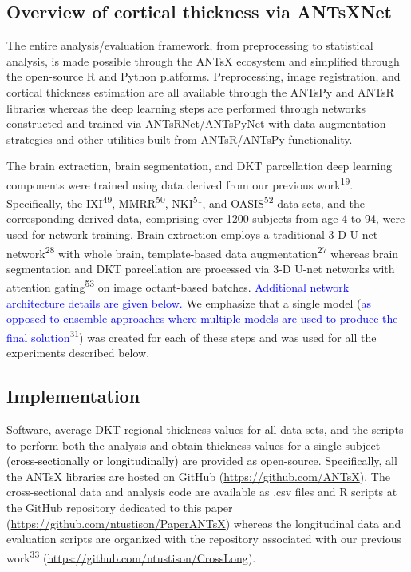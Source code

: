 \documentclass[12pt,]{article}
\begin{document}
\hypertarget{overview-of-cortical-thickness-via-antsxnet}{%
\subsection*{Overview of cortical thickness via
ANTsXNet}\label{overview-of-cortical-thickness-via-antsxnet}}

The entire analysis/evaluation framework, from preprocessing to
statistical analysis, is made possible through the ANTsX ecosystem and
simplified through the open-source R and Python platforms.
Preprocessing, image registration, and cortical thickness estimation are
all available through the ANTsPy and ANTsR libraries whereas the deep
learning steps are performed through networks constructed and trained
via ANTsRNet/ANTsPyNet with data augmentation strategies and other
utilities built from ANTsR/ANTsPy functionality.

The brain extraction, brain segmentation, and DKT parcellation deep
learning components were trained using data derived from our previous
work\textsuperscript{19}. Specifically, the IXI\textsuperscript{49},
MMRR\textsuperscript{50}, NKI\textsuperscript{51}, and
OASIS\textsuperscript{52} data sets, and the corresponding derived data,
comprising over 1200 subjects from age 4 to 94, were used for network
training. Brain extraction employs a traditional 3-D U-net
network\textsuperscript{28} with whole brain, template-based data
augmentation\textsuperscript{27} whereas brain segmentation and DKT
parcellation are processed via 3-D U-net networks with attention
gating\textsuperscript{53} on image octant-based batches.
\textcolor{blue}{Additional network architecture details are given below.}
We emphasize that a single model
(\textcolor{blue}{as opposed to ensemble
approaches where multiple models are used to produce the final solution}\textsuperscript{31})
was created for each of these steps and was used for all the experiments
described below.

\hypertarget{implementation}{%
\subsection*{Implementation}\label{implementation}}

Software, average DKT regional thickness values for all data sets, and
the scripts to perform both the analysis and obtain thickness values for
a single subject
\textcolor{black}{(cross-sectionally or longitudinally)} are provided as
open-source. Specifically, all the ANTsX libraries are hosted on GitHub
(\url{https://github.com/ANTsX}). The cross-sectional data and analysis
code are available as .csv files and R scripts at the GitHub repository
dedicated to this paper (\url{https://github.com/ntustison/PaperANTsX})
whereas the longitudinal data and evaluation scripts are organized with
the repository associated with our previous work\textsuperscript{33}
(\url{https://github.com/ntustison/CrossLong}).
\end{document}
